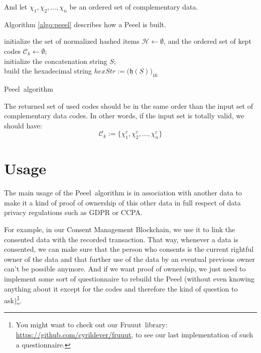 \documentclass[twoside,twocolumn]{article}
\theoremstyle{definition}
\theoremstyle{remark}
\begin{document}
And let $\chi_1, \chi_2, \dots, \chi_n$ be an ordered set of complementary data.

Algorithm \ref{algo:peeel} describes how a Peeel is built.
\begin{algorithm}
    initialize the set of normalized hashed items $\mathcal{H} \gets \emptyset$,
        and the ordered set of kept codes $\mathcal{C}_{k} \gets \emptyset$; \\
    initialize the concatenation string $S$; \\
    build the hexadecimal string $hexStr := \Big( \mathfrak{h}(S) \Big)_{16}$ \\
    \caption{Peeel\texttrademark~algorithm}
    \label{algo:peeel}
\end{algorithm}

The returned set of used codes should be in the same order than the input set of complementary data codes.
In other words, if the input set is totally valid, we should have:$$
    \mathcal{C}_{k} := \{ \chi_1^c, \chi_2^c, \dots, \chi_n^c \}
$$


\section{Usage}

The main usage of the Peeel\texttrademark~algorithm is in association with another data to make it a kind of proof of ownership of this other data 
in full respect of data privacy regulations such as GDPR or CCPA.

For example, in our Consent Management Blockchain\cite{drd2:cyd}, we use it to link the consented data with the recorded transaction.
That way, whenever a data is consented, we can make sure that the person who consents is the current rightful owner of the data and that further use 
of the data by an eventual previous owner can't be possible anymore. And if we want proof of ownership, we just need to implement some sort of 
questionnaire to rebuild the Peeel (without even knowing anything about it except for the codes and therefore the kind of question to ask)\footnote{
    You might want to check out our Fruuut\texttrademark~library: \url{https://github.com/cyrildever/fruuut}, to see our last implementation of 
    such a questionnaire.
}.
\end{document}
